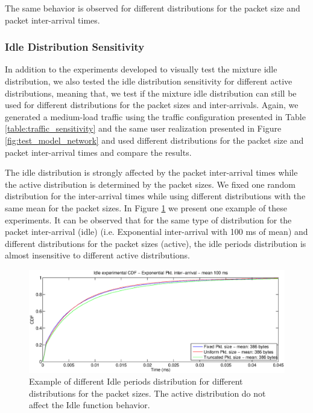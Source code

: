 The same behavior is observed for different distributions for the packet size and packet inter-arrival times.

\clearpage
\subsubsection{Idle Distribution Sensitivity}
In addition to the experiments developed to visually test the mixture idle distribution, we also tested the idle distribution sensitivity for different active distributions, meaning that, we test if the mixture idle distribution can still be used for different distributions for the packet sizes and inter-arrivals. Again, we generated a medium-load traffic using the traffic configuration presented in Table \ref{table:traffic_sensitivity} and the same user realization presented in Figure \ref{fig:test_model_network} and used different distributions for the packet size and packet inter-arrival times and compare the results.

The idle distribution is strongly affected by the packet inter-arrival times while the active distribution is determined by the packet sizes. We fixed one random distribution for the inter-arrival times while using different distributions with the same mean for the packet sizes. In Figure \ref{fig:cdf_composed} we present one example of these experiments. It can be observed that for the same type of distribution for the packet inter-arrival (idle) (i.e. Exponential inter-arrival with 100 ms of mean) and different distributions for the packet sizes (active), the idle periods distribution is almost insensitive to different active distributions.

\begin{figure}[h!]
	\centering
	\includegraphics[width=\textwidth, trim = 0mm 0mm 0mm 0mm, clip]{images/results/GlobalView/cdf_pkt_sizes}
	\caption{Example of different Idle periods distribution for different distributions for the packet sizes. The active distribution do not affect the Idle function behavior.}
	\label{fig:cdf_composed}
\end{figure}

